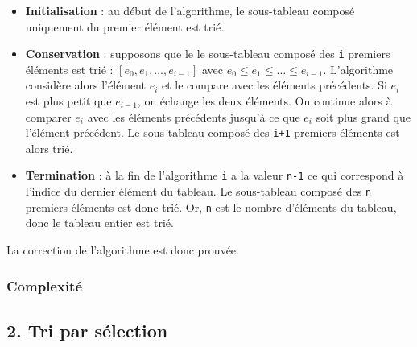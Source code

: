 \documentclass[
  a4paper,
  DIV=11,
  numbers=noendperiod]{scrartcl}
\providecommand{\tightlist}{%
  \setlength{\itemsep}{0pt}\setlength{\parskip}{0pt}}\usepackage{longtable,booktabs,array}
\begin{document}
\begin{itemize}
\tightlist
\item
  \textbf{Initialisation} : au début de l'algorithme, le sous-tableau
  composé uniquement du premier élément est trié.
\item
  \textbf{Conservation} : supposons que le le sous-tableau composé des
  \texttt{i} premiers éléments est trié :
  \([e_0, e_1, \ldots, e_{i-1}]\) avec
  \(e_0\leqslant e_1\leqslant \ldots \leqslant e_{i-1}\). L'algorithme
  considère alors l'élément \(e_i\) et le compare avec les éléments
  précédents. Si \(e_i\) est plus petit que \(e_{i-1}\), on échange les
  deux éléments. On continue alors à comparer \(e_i\) avec les éléments
  précédents jusqu'à ce que \(e_i\) soit plus grand que l'élément
  précédent. Le sous-tableau composé des \texttt{i+1} premiers éléments
  est alors trié.
\item
  \textbf{Termination} : à la fin de l'algorithme \texttt{i} a la valeur
  \texttt{n-1} ce qui correspond à l'indice du dernier élément du
  tableau. Le sous-tableau composé des \texttt{n} premiers éléments est
  donc trié. Or, \texttt{n} est le nombre d'éléments du tableau, donc le
  tableau entier est trié.
\end{itemize}

La correction de l'algorithme est donc prouvée.

\hypertarget{complexituxe9}{%
\subsubsection{Complexité}\label{complexituxe9}}

\hypertarget{tri-par-suxe9lection}{%
\subsection{2. Tri par sélection}\label{tri-par-suxe9lection}}

\hypertarget{selection}{}
\end{document}
